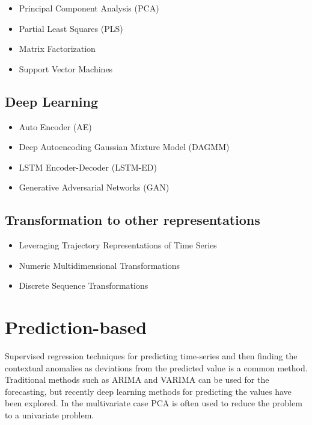 \begin{itemize}
    \item Principal Component Analysis (PCA) \cite{Li2019a}
    \item Partial Least Squares (PLS) \cite{Li2019a}
    \item Matrix Factorization \cite{Aggarwal2013a}
    \item Support Vector Machines \cite{Aggarwal2013a}
\end{itemize}

\subsection{Deep Learning}

\begin{itemize}
    \item Auto Encoder (AE) \cite{Li2019a}
    \item Deep Autoencoding Gaussian Mixture Model (DAGMM) \cite{Li2019a}
    \item LSTM Encoder-Decoder (LSTM-ED) \cite{Li2019a}
    \item Generative Adversarial Networks (GAN) \cite{Li2019a}
\end{itemize}

\subsection{Transformation to other representations}

\begin{itemize}
    \item Leveraging Trajectory Representations of Time Series \cite{Aggarwal2013a}
    \item Numeric Multidimensional Transformations \cite{Aggarwal2013a}
    \item Discrete Sequence Transformations \cite{Aggarwal2013a}
\end{itemize}

\newpage



\section{Prediction-based}

Supervised regression techniques for predicting time-series and then finding the contextual anomalies as deviations from the predicted value is a common method. Traditional methods such as ARIMA and VARIMA can be used for the forecasting, but recently deep learning methods for predicting the values have been explored. In the multivariate case PCA is often used to reduce the problem to a univariate problem.

